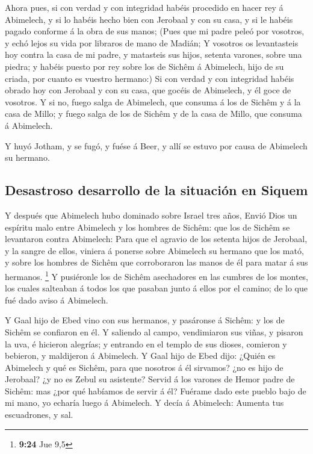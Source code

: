  Ahora pues, si con verdad y con integridad habéis
procedido en hacer rey á Abimelech, y si lo habéis hecho bien con
Jerobaal y con su casa, y si le habéis pagado conforme á la obra de sus
manos;  (Pues que mi padre peleó por vosotros, y echó lejos
su vida por libraros de mano de Madián;  Y vosotros os
levantasteis hoy contra la casa de mi padre, y matasteis sus hijos,
setenta varones, sobre una piedra; y habéis puesto por rey sobre los de
Sichêm á Abimelech, hijo de su criada, por cuanto es vuestro hermano:)
 Si con verdad y con integridad habéis obrado hoy con
Jerobaal y con su casa, que gocéis de Abimelech, y él goce de vosotros.
 Y si no, fuego salga de Abimelech, que consuma á los de
Sichêm y á la casa de Millo; y fuego salga de los de Sichêm y de la casa
de Millo, que consuma á Abimelech.

 Y huyó Jotham, y se fugó, y fuése á Beer, y allí se estuvo
por causa de Abimelech su hermano.

\hypertarget{desastroso-desarrollo-de-la-situaciuxf3n-en-siquem}{%
\subsection{Desastroso desarrollo de la situación en
Siquem}\label{desastroso-desarrollo-de-la-situaciuxf3n-en-siquem}}

 Y después que Abimelech hubo dominado sobre Israel tres
años,  Envió Dios un espíritu malo entre Abimelech y los
hombres de Sichêm: que los de Sichêm se levantaron contra Abimelech:
 Para que el agravio de los setenta hijos de Jerobaal, y la
sangre de ellos, viniera á ponerse sobre Abimelech su hermano que los
mató, y sobre los hombres de Sichêm que corroboraron las manos de él
para matar á sus hermanos. \footnote{\textbf{9:24} Jue 9,5}
 Y pusiéronle los de Sichêm asechadores en las cumbres de
los montes, los cuales salteaban á todos los que pasaban junto á ellos
por el camino; de lo que fué dado aviso á Abimelech.

 Y Gaal hijo de Ebed vino con sus hermanos, y pasáronse á
Sichêm: y los de Sichêm se confiaron en él.  Y saliendo al
campo, vendimiaron sus viñas, y pisaron la uva, é hicieron alegrías; y
entrando en el templo de sus dioses, comieron y bebieron, y maldijeron á
Abimelech.  Y Gaal hijo de Ebed dijo: ¿Quién es Abimelech y
qué es Sichêm, para que nosotros á él sirvamos? ¿no es hijo de Jerobaal?
¿y no es Zebul su asistente? Servid á los varones de Hemor padre de
Sichêm: mas ¿por qué habíamos de servir á él?  Fuérame dado
este pueblo bajo de mi mano, yo echaría luego á Abimelech. Y decía á
Abimelech: Aumenta tus escuadrones, y sal.

